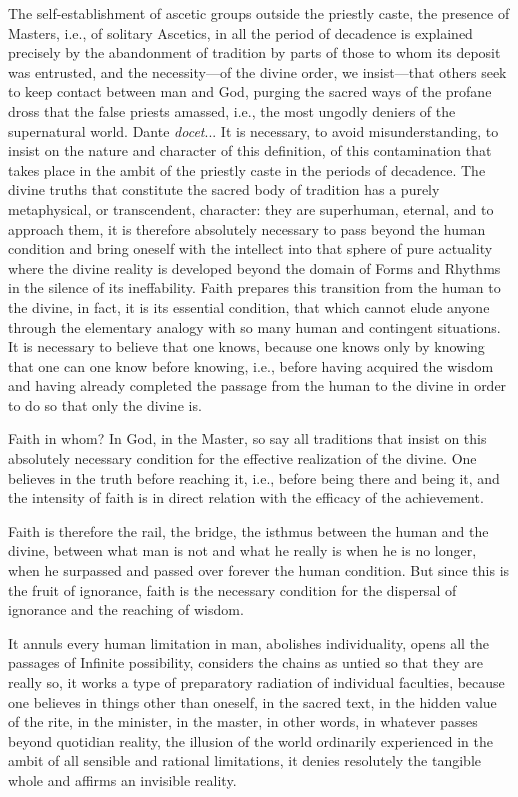 The self-establishment of ascetic groups outside the priestly caste, the presence of Masters, i.e., of solitary Ascetics, in all the period of decadence is explained precisely by the abandonment of tradition by parts of those to whom its deposit was entrusted, and the necessity---of the divine order, we insist---that others seek to keep contact between man and God, purging the sacred ways of the profane dross that the false priests amassed, i.e., the most ungodly deniers of the supernatural world. Dante \emph{docet}... It is necessary, to avoid misunderstanding, to insist on the nature and character of this definition, of this contamination that takes place in the ambit of the priestly caste in the periods of decadence. The divine truths that constitute the sacred body of tradition has a purely metaphysical, or transcendent, character: they are superhuman, eternal, and to approach them, it is therefore absolutely necessary to pass beyond the human condition and bring oneself with the intellect into that sphere of pure actuality where the divine reality is developed beyond the domain of Forms and Rhythms in the silence of its ineffability. Faith prepares this transition from the human to the divine, in fact, it is its essential condition, that which cannot elude anyone through the elementary analogy with so many human and contingent situations. It is necessary to believe that one knows, because one knows only by knowing that one can one know before knowing, i.e., before having acquired the wisdom and having already completed the passage from the human to the divine in order to do so that only the divine is.

Faith in whom? In God, in the Master, so say all traditions that insist on this absolutely necessary condition for the effective realization of the divine. One believes in the truth before reaching it, i.e., before being there and being it, and the intensity of faith is in direct relation with the efficacy of the achievement.

Faith is therefore the rail, the bridge, the isthmus between the human and the divine, between what man is not and what he really is when he is no longer, when he surpassed and passed over forever the human condition. But since this is the fruit of ignorance, faith is the necessary condition for the dispersal of ignorance and the reaching of wisdom.

It annuls every human limitation in man, abolishes individuality, opens all the passages of Infinite possibility, considers the chains as untied so that they are really so, it works a type of preparatory radiation of individual faculties, because one believes in things other than oneself, in the sacred text, in the hidden value of the rite, in the minister, in the master, in other words, in whatever passes beyond quotidian reality, the illusion of the world ordinarily experienced in the ambit of all sensible and rational limitations, it denies resolutely the tangible whole and affirms an invisible reality.

